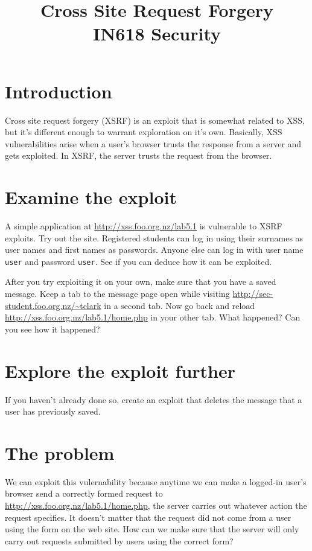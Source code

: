 \documentclass{article}
\begin{document}
\title{Cross Site Request Forgery\\ IN618 Security}
\date{}
\maketitle

\section*{Introduction}
Cross site request forgery (XSRF) is an exploit that is somewhat related to XSS,
but it's different enough to warrant exploration on it's own.  Basically,
XSS vulnerabilities arise when a user's browser trusts the response from a
server and gets exploited.  In XSRF, the server trusts the request from the 
browser.

\section{Examine the exploit}
A simple application at \url{http://xss.foo.org.nz/lab5.1} is vulnerable
to XSRF exploits. Try out the site.  Registered students can log in using their surnames
as user names and first names as passwords. Anyone else can log in with user name \texttt{user}
and password \texttt{user}. See if you can deduce how it can be exploited. 

After you try exploiting it on your own, make sure that you have a saved 
message. Keep a tab to the message page open while visiting 
\url{http://sec-student.foo.org.nz/~tclark} in a second tab.  Now go back
and reload \url{http://xss.foo.org.nz/lab5.1/home.php} in your other tab.
What happened?  Can you see how it happened?

\newpage

\section{Explore the exploit further}
If you haven't already done so, create an exploit that deletes the message that a user has previously saved.

\vspace{75mm}

\section{The problem}
We can exploit this vulernability because anytime we can make a logged-in user's browser send a correctly formed request to \url{http://xss.foo.org.nz/lab5.1/home.php}, the server carries out whatever action the request specifies. It doesn't matter that the request did not come from a user using the form on the web site. How can we make sure that the server will only carry out requests submitted by users using the correct form?
\end{document}
